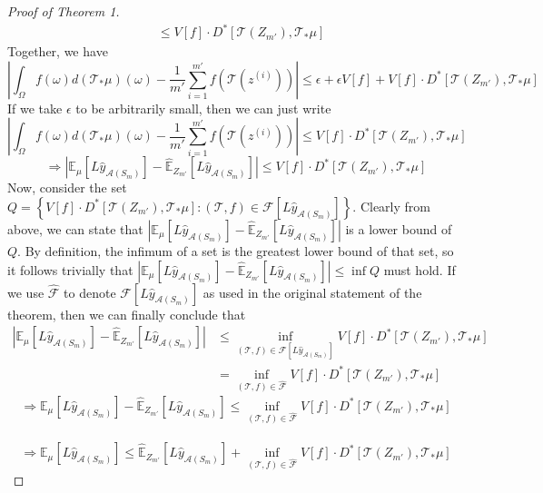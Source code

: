 \documentclass{article}
\begin{document}
\begin{proof}[Proof of Theorem 1]
\begin{align*}
        & \leq V[f] \cdot  D^*[\mathcal{T}(Z_{m'}), \mathcal{T}_{*}\mu]
    \end{align*}
    Together, we have
    \[\left| \int_{\Omega} f(\omega) d(\mathcal{T}_{*}\mu)(\omega) -  \frac{1}{m'} \sum_{i=1}^{m'} f(\mathcal{T}(z^{(i)})) \right| \leq \epsilon + \epsilon V[f] + V[f] \cdot  D^*[\mathcal{T}(Z_{m'}), \mathcal{T}_{*}\mu]\]
    If we take $\epsilon$ to be arbitrarily small, then we can just write
    \[\left| \int_{\Omega} f(\omega) d(\mathcal{T}_{*}\mu)(\omega) -  \frac{1}{m'} \sum_{i=1}^{m'} f(\mathcal{T}(z^{(i)})) \right| \leq V[f] \cdot  D^*[\mathcal{T}(Z_{m'}), \mathcal{T}_{*}\mu]\]
    \[ \Longrightarrow \left| \mathbb{E}_{\mu}[L \hat{y}_{\mathcal{A}(S_m)}] - \hat{\mathbb{E}}_{Z_{m'}}[L \hat{y}_{\mathcal{A}(S_m)}] \right| \leq V[f] \cdot  D^*[\mathcal{T}(Z_{m'}), \mathcal{T}_{*}\mu]\]
    Now, consider the set $Q = \left\{ V[f] \cdot  D^*[\mathcal{T}(Z_{m'}), \mathcal{T}_{*}\mu] : (\mathcal{T}, f) \in \mathcal{F}[L \hat{y}_{\mathcal{A}(S_m)}] \right\}$. Clearly from above, we can state that $\left| \mathbb{E}_{\mu}[L \hat{y}_{\mathcal{A}(S_m)}] - \hat{\mathbb{E}}_{Z_{m'}}[L \hat{y}_{\mathcal{A}(S_m)}] \right|$ is a lower bound of $Q$. By definition, the infimum of a set is the greatest lower bound of that set, so it follows trivially that $\left| \mathbb{E}_{\mu}[L \hat{y}_{\mathcal{A}(S_m)}] - \hat{\mathbb{E}}_{Z_{m'}}[L \hat{y}_{\mathcal{A}(S_m)}] \right| \leq \inf Q$ must hold. If we use $\hat{\mathcal{F}}$ to denote $\mathcal{F}[L \hat{y}_{\mathcal{A}(S_m)}]$ as used in the original statement of the theorem, then we can finally conclude that
    \begin{align*}
        \left| \mathbb{E}_{\mu}[L \hat{y}_{\mathcal{A}(S_m)}] - \hat{\mathbb{E}}_{Z_{m'}}[L \hat{y}_{\mathcal{A}(S_m)}] \right| & \leq \inf_{(\mathcal{T}, f) \in \mathcal{F}[L \hat{y}_{\mathcal{A}(S_m)}]} V[f] \cdot  D^*[\mathcal{T}(Z_{m'}), \mathcal{T}_{*}\mu] \\
        & = \inf_{(\mathcal{T}, f) \in \hat{\mathcal{F}}} V[f] \cdot  D^*[\mathcal{T}(Z_{m'}), \mathcal{T}_{*}\mu]
    \end{align*}
    \[\Longrightarrow \mathbb{E}_{\mu}[L \hat{y}_{\mathcal{A}(S_m)}] - \hat{\mathbb{E}}_{Z_{m'}}[L \hat{y}_{\mathcal{A}(S_m)}] \leq \inf_{(\mathcal{T}, f) \in \hat{\mathcal{F}}} V[f] \cdot  D^*[\mathcal{T}(Z_{m'}), \mathcal{T}_{*}\mu]\] \\
    \[\Longrightarrow \mathbb{E}_{\mu}[L \hat{y}_{\mathcal{A}(S_m)}] \leq \hat{\mathbb{E}}_{Z_{m'}}[L \hat{y}_{\mathcal{A}(S_m)}] + \inf_{(\mathcal{T}, f) \in \hat{\mathcal{F}}} V[f] \cdot  D^*[\mathcal{T}(Z_{m'}), \mathcal{T}_{*}\mu]\]
\end{proof}
\end{document}
